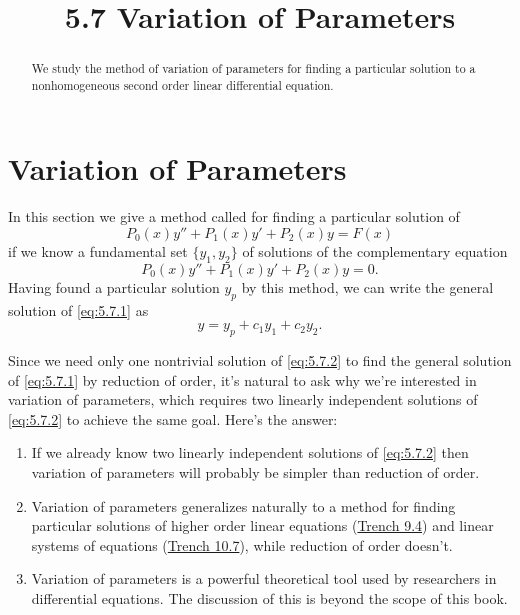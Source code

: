 \documentclass{ximera}
\title{5.7 Variation of Parameters}
\begin{document}
 
\begin{abstract}
 We study the method of variation of parameters for finding a particular solution to a nonhomogeneous second order linear differential equation.
\end{abstract}
 
\maketitle
 
\section*{Variation of Parameters}
 
In this section we give a method called  for finding a particular solution of
\begin{equation} \label{eq:5.7.1}
P_0(x)y''+P_1(x)y'+P_2(x)y=F(x)
\end{equation}
if we know a fundamental set $\{y_1,y_2\}$ of solutions of  the
complementary equation
\begin{equation} \label{eq:5.7.2}
P_0(x)y''+P_1(x)y'+P_2(x)y=0.
\end{equation}
Having found a particular solution $y_p$ by this method, we can write
the general solution of \eqref{eq:5.7.1} as
$$
y=y_p+c_1y_1+c_2y_2.
$$
 
Since we need only one nontrivial solution of \eqref{eq:5.7.2} to find the
general solution of \eqref{eq:5.7.1} by reduction of order, it's natural
to ask why we're interested in variation of parameters, which requires
two linearly independent solutions of \eqref{eq:5.7.2} to achieve the same
goal. Here's the answer:
 
\begin{enumerate}
\item If we already know two linearly independent solutions of
\eqref{eq:5.7.2} then  variation of parameters will probably  be simpler
than reduction of order.
 
\item Variation of parameters generalizes naturally to a method
for finding particular solutions of higher order
linear equations (\href{https://ximera.osu.edu/ode/main/varParHigherOrder/varParHigherOrder}{Trench 9.4}) and  linear systems of
equations
(\href{https://ximera.osu.edu/ode/main/varParamNonHomLinSys/varParamNonHomLinSys}{Trench 10.7}), while reduction of order doesn't.
 
\item Variation of parameters is a powerful theoretical tool
 used by researchers in differential equations. The discussion of this is beyond the scope of this book.
  
 \end{enumerate}
 
\end{document}
